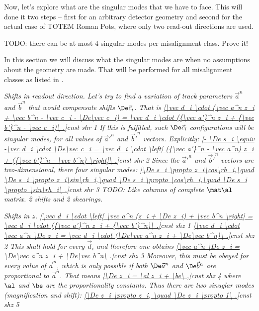 Now, let's explore what are the singular modes that we have to face. This will done it two steps -- first for an arbitrary detector geometry and second for the actual case of TOTEM Roman Pots, where only two read-out directions are used.

TODO: there can be at most 4 singular modes per misalignment class. Prove it!


In this section we will discuss what the singular modes are when no assumptions about the geometry are made. That will be performed for all misalignment classes as listed in .

\em{Shifts in readout direction}. Let's try to find a variation of track parameters $\vec a^n$ and $\vec b^n$ that would compensate shifts $\De\vec c_i$. That is
\eqref{\vec d_i \cdot (\vec a^n z_i + \vec b^n - \vec c_i - \De\vec c_i) = \vec d_i \cdot ({\vec a'}^n z_i + {\vec b'}^n - \vec c_i)\ .}{cnst shr 1}
If this is fulfilled, such $\De\vec c_i$ configurations will be singular modes, for all values of ${\vec a'}^n$ and ${\vec b'}^n$ vectors. Explicitly:
\eqref{- \De s_i \equiv -\vec d_i \cdot \De\vec c_i = \vec d_i \cdot \left[ ({\vec a'}^n - \vec a^n) z_i + ({\vec b'}^n - \vec b^n) \right]\ .}{cnst shr 2}
Since the ${\vec a'}^n$ and ${\vec b'}^n$ vectors are two-dimensional, there four singular modes:
\eqref{\De s_i \propto z_i\cos\rh_i,\quad \De s_i \propto z_i\sin\rh_i,\quad \De s_i \propto \cos\rh_i,\quad \De s_i \propto \sin\rh_i\ .}{cnst shr 3}
TODO: Like columns of complete $\mat\al$ matrix. 2 shifts and 2 shearings.


\em{Shifts in $z$}. 
\eqref{\vec d_i \cdot \left[ \vec a^n (z_i + \De z_i) + \vec b^n \right] = \vec d_i \cdot ({\vec a'}^n z_i + {\vec b'}^n)\ .}{cnst shz 1}
\eqref{\vec d_i \cdot \vec a^n \De z_i = \vec d_i \cdot (\De\vec a^n z_i + \De\vec b^n)\ .}{cnst shz 2}
This shall hold for every $\vec d_i$ and therefore one obtains
\eqref{\vec a^n \De z_i = \De\vec a^n z_i + \De\vec b^n\ .}{cnst shz 3}
Moreover, this must be obeyed for every value of $\vec a^n$, which is only possible if both $\De\vec a^n$ and $\De\vec b^n$ are proportional to $\vec a^n$. That means
\eqref{\De z_i = \al z_i + \be\ ,}{cnst shz 4}
where $\al$ and $\be$ are the proportionality constants. Thus there are two sinuglar modes (magnification and shift):
\eqref{\De z_i \propto z_i, \quad \De z_i \propto 1\ .}{cnst shz 5}

